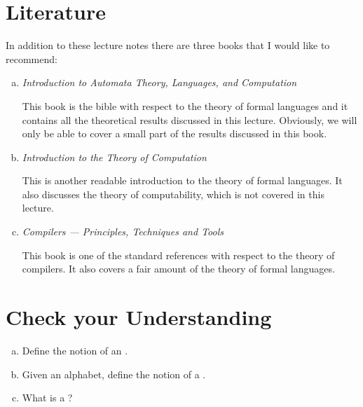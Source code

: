 \section{Literature}
In addition to these lecture notes there are three books that I would like to recommend:
\begin{enumerate}[(a)]
\item \emph{Introduction to Automata Theory, Languages, and Computation}
      \cite{hopcroft:06}

      This book is the bible with respect to the theory of formal languages and it contains all the theoretical
      results discussed in this lecture. 
      Obviously, we will only be able to cover a small part of the results discussed in this book.
\item \emph{Introduction to the Theory of Computation}
      \cite{sipser:2006}

      This is another readable introduction to the theory of formal languages.  It also discusses
      the theory of computability, which is not covered in this lecture.
\item \emph{Compilers --- Principles, Techniques and Tools}
      \cite{aho:2006}

      This book is one of the standard references with respect to the theory of compilers.  It also covers a fair amount of
      the theory of formal languages.
\end{enumerate}

\section{Check your Understanding}
\begin{enumerate}[(a)]
\item Define the notion of an .
\item Given an alphabet, define the notion of a .
\item What is a ?
\end{enumerate}


